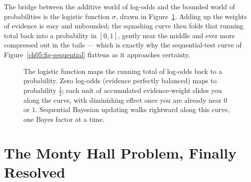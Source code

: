 The bridge between the additive world of log-odds and the bounded world of probabilities
is the logistic function $\sigma$, drawn in Figure~\ref{ch05:fig-logistic}. Adding up the
weights of evidence is easy and unbounded; the squashing curve then folds that running
total back into a probability in $[0,1]$, gently near the middle and ever more compressed
out in the tails --- which is exactly why the sequential-test curve of
Figure~\ref{ch05:fig-sequential} flattens as it approaches certainty.

\begin{figure}[H]
\centering
{}
\caption{The logistic function maps the running total of log-odds back to a probability.
Zero log-odds (evidence perfectly balanced) maps to probability $\tfrac12$; each unit of
accumulated evidence-weight slides you along the curve, with diminishing effect once you
are already near $0$ or $1$. Sequential Bayesian updating walks rightward along this curve,
one Bayes factor at a time.}
\label{ch05:fig-logistic}
\end{figure}

\section{The Monty Hall Problem, Finally Resolved}
\label{ch05:monty}


